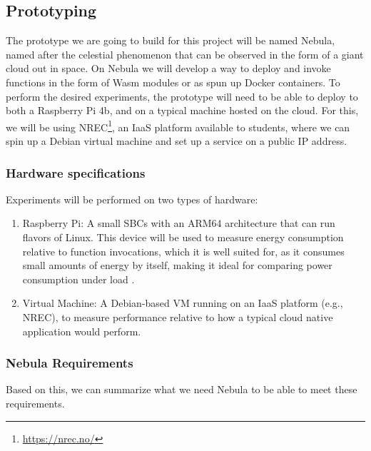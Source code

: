 \documentclass[
  table]{report}
\begin{document}
\subsection{Prototyping}
\label{sect:prototyping}

The prototype we are going to build for this project will be named
Nebula, named after the celestial phenomenon that can be observed in the
form of a giant cloud out in space. On Nebula we will develop a way to
deploy and invoke functions in the form of \ac{Wasm} modules or as spun
up Docker containers. To perform the desired experiments, the prototype
will need to be able to deploy to both a Raspberry Pi 4b, and on a
typical machine hosted on the cloud. For this, we will be using
\ac{NREC}\footnote{\url{https://nrec.no/}}, an IaaS platform available
to students, where we can spin up a Debian virtual machine and set up a
service on a public IP address.

\subsubsection{Hardware specifications}
\label{sect:hardware_spec}

Experiments will be performed on two types of hardware:

\begin{enumerate}
\def\labelenumi{\arabic{enumi}.}
\item
  Raspberry Pi: A small \ac{SBC}s with an ARM64 architecture that can
  run flavors of Linux. This device will be used to measure energy
  consumption relative to function invocations, which it is well suited
  for, as it consumes small amounts of energy by itself, making it ideal
  for comparing power consumption under load
  \citep{bekarooPowerConsumptionRaspberry2016}.
\item
  Virtual Machine: A Debian-based VM running on an \ac{IaaS} platform
  (e.g., \ac{NREC}), to measure performance relative to how a typical
  cloud native application would perform.
\end{enumerate}

\newpage
\subsubsection{Nebula Requirements}
\label{sect:nebula_req}

Based on this, we can summarize what we need Nebula to be able to meet
these requirements.
\end{document}

